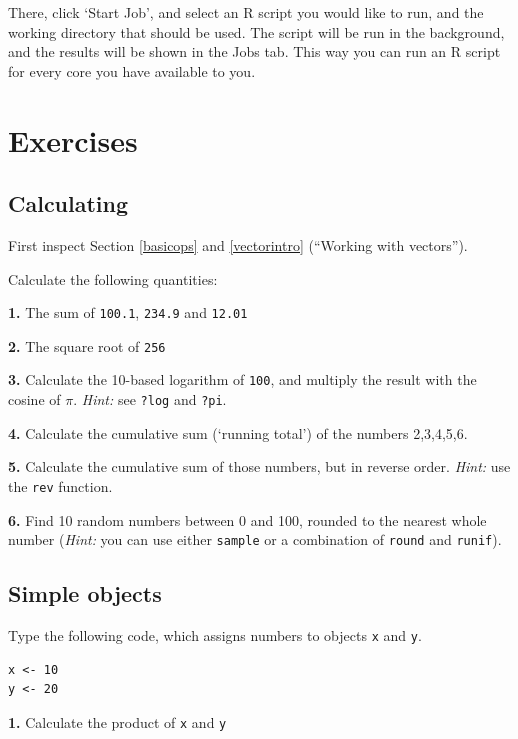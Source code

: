 \documentclass[]{book}
\begin{document}
There, click `Start Job', and select an R script you would like to run, and the working directory that should be used. The script will be run in the background, and the results will be shown in the Jobs tab. This way you can run an R script for every core you have available to you.

\hypertarget{exercises}{%
\section{Exercises}\label{exercises}}

\hypertarget{calculating}{%
\subsection{Calculating}\label{calculating}}

First inspect Section \ref{basicops} and \ref{vectorintro} (``Working with vectors'').

Calculate the following quantities:

\textbf{1.} The sum of \texttt{100.1}, \texttt{234.9} and \texttt{12.01}

\textbf{2.} The square root of \texttt{256}

\textbf{3.} Calculate the 10-based logarithm of \texttt{100}, and multiply the result with the cosine of \(\pi\). \emph{Hint:} see \texttt{?log} and \texttt{?pi}.

\textbf{4.} Calculate the cumulative sum (`running total') of the numbers 2,3,4,5,6.

\textbf{5.} Calculate the cumulative sum of those numbers, but in reverse order. \emph{Hint:} use the \texttt{rev} function.

\textbf{6.} Find 10 random numbers between 0 and 100, rounded to the nearest whole number (\emph{Hint:} you can use either \texttt{sample} or a combination of \texttt{round} and \texttt{runif}).

\hypertarget{simple-objects}{%
\subsection{Simple objects}\label{simple-objects}}

Type the following code, which assigns numbers to objects \texttt{x} and \texttt{y}.

\begin{verbatim}
x <- 10
y <- 20
\end{verbatim}

\textbf{1.} Calculate the product of \texttt{x} and \texttt{y}
\end{document}

